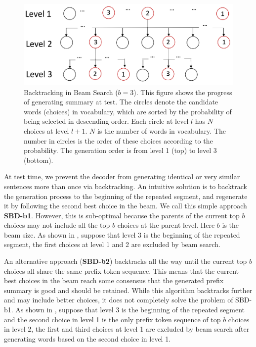 \begin{figure}[th]
    \centering
    \includegraphics[width=0.7\linewidth]{SBD}
    \caption{Backtracking in Beam Search ($b=3$). 
	    This figure shows the progress of generating summary at test. The circles denote the
		candidate words (choices) in vocabulary, 
		which are sorted by the probability of being selected in
		descending order. Each circle at level $l$ has $N$ choices 
		at level $l+1$. $N$ is the number of words in vocabulary. 
		The number in circles is the order of these choices according to the
		probability. The generation order is from level 1 (top) to level 3 (bottom).}
    \label{fig:beam}
\end{figure}

At test time, we prevent the decoder from generating identical or
very similar sentences more than once via backtracking. 
An intuitive solution is to backtrack the generation process to the beginning
of the repeated segment, and regenerate it by following the second best choice
in the beam. We call this simple approach \textbf{SBD-b1}.
However, this is sub-optimal
because the parents of the current top $b$ choices may not include all the top $b$ choices at the
parent level. Here $b$ is the beam size. As shown in , suppose that level 3 is the
beginning of the repeated segment, the first choices at level 1 and 2 are excluded by beam search. 

An alternative approach (\textbf{SBD-b2}) backtracks all the way until the current
top $b$ choices all share the same prefix token sequence. This means
that the current best choices in the beam reach some consensus that
the generated prefix summary is good and should be retained. 
While this algorithm backtracks further and may
include better choices, it does not completely solve the problem of SBD-b1. 
As shown in , 
suppose that level 3 is the beginning of the repeated segment and the second choice in
level 1 is the only prefix token sequence of top $b$ choices in level 2, the first and third choices at
level 1 are excluded by beam search after generating words based on the second choice in level 1.

